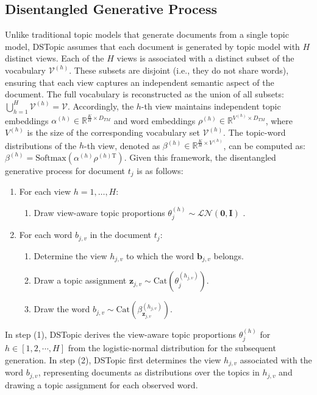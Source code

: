 \subsection{Disentangled Generative Process}
\label{chapter:generation}

Unlike traditional topic models that generate documents from a single topic model, DSTopic assumes that each document is generated by topic model with $ H $ distinct views. Each of the $ H $ views is associated with a distinct subset of the vocabulary $\mathcal{V}^{(h)}$. These subsets are disjoint (i.e., they do not share words), ensuring that each view captures an independent semantic aspect of the document. The full vocabulary is reconstructed as the union of all subsets: $ \bigcup_{h=1}^H \mathcal{V}^{(h)} = \mathcal{V} $. 
Accordingly, the $ h $-th view maintains independent topic embeddings $ \alpha^{(h)} \in \mathbb{R}^{\frac{K}{H} \times D_{TM}} $ and word embeddings $ \rho^{(h)} \in \mathbb{R}^{V^{(h)} \times D_{TM}} $, where $ V^{(h)} $ is the size of the corresponding vocabulary set $ \mathcal{V}^{(h)} $. The topic-word distributions of the $ h $-th view, denoted as $ \beta^{(h)} \in \mathbb{R}^{\frac{K}{H} \times V^{(h)}} $, can be computed as: $ \beta^{(h)} = \text{Softmax}(\alpha^{(h)} \rho^{(h)\mathrm{T}}) $. 
Given this framework, the disentangled generative process for document $ t_j $ is as follows:
\begin{enumerate}
    \item For each view $h = 1, \dots, H$:
    \begin{enumerate}
        \item Draw view-aware topic proportions $ \theta_{j}^{(h)} \sim \mathcal{LN}(\mathbf{0}, \mathbf{I}) $ .
    \end{enumerate}
    
    \item For each word $ b_{j,v} $ in the document $ t_j $:
    \begin{enumerate}
        \item Determine the view $ h_{j,v} $ to which the word $ \mathbf{b}_{j,v} $ belongs.
        \item Draw a topic assignment $ \mathbf{z}_{j,v} \sim \text{Cat}(\theta_{j}^{(h_{j,v})}) $.
        \item Draw the word $ b_{j,v} \sim \text{Cat}(\beta_{\mathbf{z}_{j,v}}^{(h_{j,v})}) $.
    \end{enumerate}
\end{enumerate}

In step (1), DSTopic derives the view-aware topic proportions $ \theta_{j}^{(h)} $ for $ h \in [1, 2, \cdots, H] $ from the logistic-normal distribution for the subsequent generation. In step (2), DSTopic first determines the view $ h_{j,v} $ associated with the word $ b_{j,v} $, representing documents as distributions over the topics in $ h_{j,v} $ and drawing a topic assignment for each observed word.


